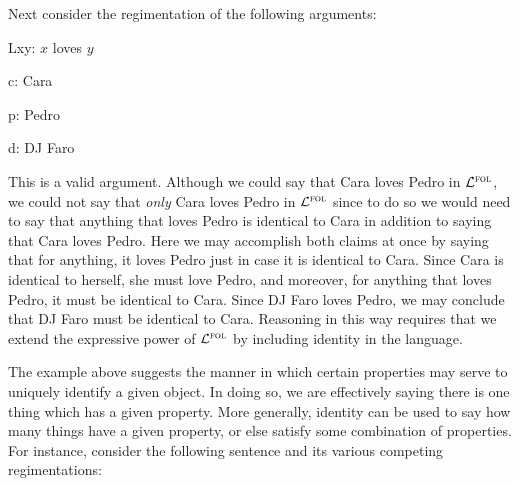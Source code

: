 Next consider the regimentation of the following arguments:

\begin{multicols}{2}
  \begin{ekey}
    \item[Lxy:] $x$ loves $y$
    \item[c:] Cara
    \item[p:] Pedro
    \item[d:] DJ Faro
  \end{ekey}

  \vfill
  \strut
  \columnbreak

  \begin{earg} \label{cara}
  \end{earg}

  \begin{earg} \label{caraF}
  \end{earg}
\end{multicols}

This is a valid argument.
Although we could say that Cara loves Pedro in $\mathcal{L}^{\textsc{fol}}$, we could not say that \textit{only} Cara loves Pedro in $\mathcal{L}^{\textsc{fol}}$ since to do so we would need to say that anything that loves Pedro is identical to Cara in addition to saying that Cara loves Pedro.
Here we may accomplish both claims at once by saying that for anything, it loves Pedro just in case it is identical to Cara.
Since Cara is identical to herself, she must love Pedro, and moreover, for anything that loves Pedro, it must be identical to Cara.
Since DJ Faro loves Pedro, we may conclude that DJ Faro must be identical to Cara.
Reasoning in this way requires that we extend the expressive power of $\mathcal{L}^{\textsc{fol}}$ by including identity in the language.

The example above suggests the manner in which certain properties may serve to uniquely identify a given object.
In doing so, we are effectively saying there is one thing which has a given property.
More generally, identity can be used to say how many things have a given property, or else satisfy some combination of properties.
For instance, consider the following sentence and its various competing regimentations:

\begin{earg} \label{mo}
\end{earg}

